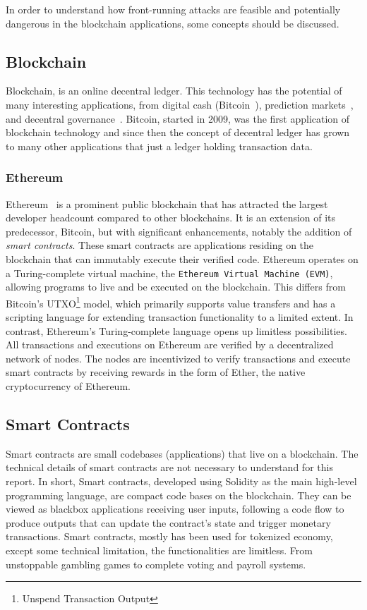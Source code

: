 In order to understand how front-running attacks are feasible and potentially dangerous in the blockchain applications, some concepts should be discussed.  

\subsection{Blockchain}
Blockchain, is an online decentral ledger. This technology has the potential of many interesting applications, from digital cash (\eg Bitcoin~\cite{nakamoto2008bitcoin}), prediction markets~\cite{clark2014decentralizing}, and decentral governance~\cite{aragonwebsite}. Bitcoin, started in 2009, was the first application of blockchain technology and since then the concept of decentral ledger has grown to many other applications that just a ledger holding transaction data. 

\subsubsection{Ethereum}


Ethereum~\cite{wood2014ethereum} is a prominent public blockchain that has attracted the largest developer headcount compared to other blockchains. It is an extension of its predecessor, Bitcoin, but with significant enhancements, notably the addition of \textit{smart contracts}. These smart contracts are applications residing on the blockchain that can immutably execute their verified code. Ethereum operates on a Turing-complete virtual machine, the \texttt{Ethereum Virtual Machine (EVM)}, allowing programs to live and be executed on the blockchain. This differs from Bitcoin's UTXO\footnote{Unspend Transaction Output} model, which primarily supports value transfers and has a scripting language for extending transaction functionality to a limited extent. In contrast, Ethereum's Turing-complete language opens up limitless possibilities.  All transactions and executions on Ethereum are verified by a decentralized network of nodes. The nodes are incentivized to verify transactions and execute smart contracts by receiving rewards in the form of Ether, the native cryptocurrency of Ethereum.


\subsection{Smart Contracts}
Smart contracts are small codebases (applications) that live on a blockchain. The technical details of smart contracts are not necessary to understand for this report. In short, Smart contracts, developed using Solidity as the main high-level programming language, are compact code bases on the blockchain. They can be viewed as blackbox applications receiving user inputs, following a code flow to produce outputs that can update the contract's state and trigger monetary transactions. Smart contracts, mostly has been used for tokenized economy, except some technical limitation, the functionalities are limitless. From unstoppable gambling games to complete voting and payroll systems. 

